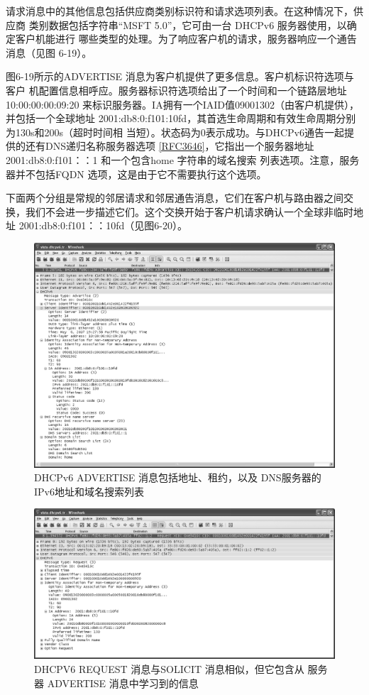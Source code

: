 请求消息中的其他信息包括供应商类别标识符和请求选项列表。在这种情况下，供应商
类别数据包括字符串“MSFT 5.0”，它可由一台 DHCPv6 服务器使用，以确定客户机能进行
哪些类型的处理。为了响应客户机的请求，服务器响应一个通告消息（见图 6-19）。

图6-19所示的ADVERTISE 消息为客户机提供了更多信息。客户机标识符选项与客户
机配置信息相呼应。服务器标识符选项给出了一个时间和一个链路层地址 10:00:00:00:09:20
来标识服务器。IA拥有一个IAID值09001302（由客户机提供），并包括一个全球地址
2001:db8:0:f101:10fd，其首选生命周期和有效生命周期分别为130s和200s（超时时间相
当短）。状态码为0表示成功。与DHCPv6通告一起提供的还有DNS递归名称服务器选项
\href{https://www.rfc-editor.org/rfc/rfc3646}{\href{https://www.rfc-editor.org/rfc/rfc3646}{[RFC3646]}}，它指出一个服务器地址 2001:db8:0:f101：：1 和一个包含home 字符串的域名搜索
列表选项。注意，服务器并不包括FQDN 选项，这是由于它不需要执行这个选项。

下面两个分组是常规的邻居请求和邻居通告消息，它们在客户机与路由器之间交
换，我们不会进一步描述它们。这个交换开始于客户机请求确认一个全球非临时地址
2001:db8:0:f101：：10fd（见图6-20）。

\begin{figure}[H]
    \centering
	\includegraphics[scale=0.5]{imgs/6/6-19.png}
	\caption{DHCPv6 ADVERTISE 消息包括地址、租约，以及 DNS服务器的IPv6地址和域名搜索列表}
\end{figure}

\begin{figure}[H]
    \centering
	\includegraphics[scale=0.5]{imgs/6/6-20.png}
	\caption{DHCPV6 REQUEST 消息与SOLICIT 消息相似，但它包含从
    服务器 ADVERTISE 消息中学习到的信息}
\end{figure}

